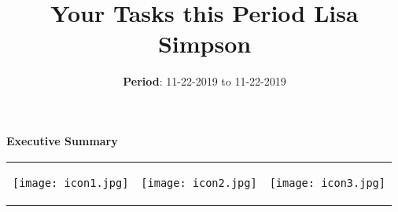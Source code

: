 \documentclass[a4paper]{article}
\title{Your Tasks this Period \textbar{} Lisa Simpson}
\author{\textbf{Period}: 11-22-2019 to 11-22-2019}
\date{}
\begin{document}
\maketitle

\hrulefill
     \begin{center}
     \Large{\textbf{Executive Summary}}
     \end{center}

\begin{table}[h!]
     \begin{center}
     \begin{tabular}{m{5cm} m{5cm} m{5cm}}
     \begin {minipage} {5cm}
     \begin{center}
     \texttt{[image: icon1.jpg]}
     \end{center}
     \end{minipage}
      &
     \begin {minipage} {5cm}
          \begin{center}
     \texttt{[image: icon2.jpg]}
          \end{center}
     \end{minipage}
     &
     \begin {minipage} {5cm}
          \begin{center}
     \texttt{[image: icon3.jpg]}
          \end{center}
     \end{minipage}
      \end{tabular}
      \end{center}
      \end{table}
\end{document}
